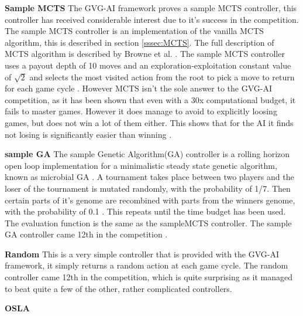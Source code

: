 \documentclass[journal]{IEEEtran}
\begin{document}
		
		\textbf{Sample MCTS} \label{sssec:sampleMCTS}
			The GVG-AI framework proves a sample MCTS controller, this controller has received considerable interest due to it's success in the competition. 
			The sample MCTS controller is an implementation of the vanilla MCTS algorithm, this is described in section \ref{sssec:MCTS}. 
			The full description of MCTS algorithm is described by Browne et al. \cite{browne2012survey}.
			The sample MCTS controller uses a payout depth of 10 moves and an exploration-exploitation constant value of $\sqrt{2}$ and selects the most visited action from the root to pick a move to return for each game cycle \cite{perez20162014}.
			However MCTS isn't the sole answer to the GVG-AI competition, as it has been shown that even with a 30x computational budget, it fails to master games. However it does manage to avoid to explicitly loosing games, but does not win a lot of them either. This shows that for the AI it finds not losing is significantly easier than winning \cite{nelson2016investigating}.

		\textbf{sample GA}
			The sample Genetic Algorithm(GA) controller is a rolling horizon open loop implementation for a minimalistic steady state genetic algorithm, known as microbial GA \cite{harvey2009microbial}.
			A tournament takes place between two players and the loser of the tournament is mutated randomly, with the probability of 1/7. Then certain parts of it's genome are recombined with parts from the winners genome, with the probability of 0.1 \cite{perez20162014}. 
			This repeats until the time budget has been used. The evaluation function is the same as the sampleMCTS controller.
			The sample GA controller came 12th in the competition \cite{perez20162014}.

		\textbf{Random}
			This is a very simple controller that is provided with the GVG-AI framework, it simply returns a random action at each game cycle.
			The random controller came 12th in the competition, which is quite surprising as it managed to beat quite a few of the other, rather complicated controllers.

		\textbf{OSLA}






		

		


\end{document}
